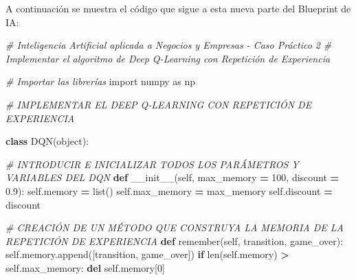 \documentclass[
]{book}
\newenvironment{Shaded}{\begin{snugshade}}{\end{snugshade}}
\newcommand{\BuiltInTok}[1]{#1}
\newcommand{\CommentTok}[1]{\textcolor[rgb]{0.56,0.35,0.01}{\textit{#1}}}
\newcommand{\ControlFlowTok}[1]{\textcolor[rgb]{0.13,0.29,0.53}{\textbf{#1}}}
\newcommand{\DecValTok}[1]{\textcolor[rgb]{0.00,0.00,0.81}{#1}}
\newcommand{\FloatTok}[1]{\textcolor[rgb]{0.00,0.00,0.81}{#1}}
\newcommand{\FunctionTok}[1]{\textcolor[rgb]{0.00,0.00,0.00}{#1}}
\newcommand{\ImportTok}[1]{#1}
\newcommand{\KeywordTok}[1]{\textcolor[rgb]{0.13,0.29,0.53}{\textbf{#1}}}
\newcommand{\NormalTok}[1]{#1}
\newcommand{\OperatorTok}[1]{\textcolor[rgb]{0.81,0.36,0.00}{\textbf{#1}}}
\newcommand{\VariableTok}[1]{\textcolor[rgb]{0.00,0.00,0.00}{#1}}
\begin{document}
A continuación se muestra el código que sigue a esta nueva parte del Blueprint de IA:

\begin{Shaded}
\begin{Highlighting}[]
\CommentTok{\# Inteligencia Artificial aplicada a Negocios y Empresas {-} Caso Práctico 2}
\CommentTok{\# Implementar el algoritmo de Deep Q{-}Learning con Repetición de Experiencia}

\CommentTok{\# Importar las librerías}
\ImportTok{import}\NormalTok{ numpy }\ImportTok{as}\NormalTok{ np}

\CommentTok{\# IMPLEMENTAR EL DEEP Q{-}LEARNING CON REPETICIÓN DE EXPERIENCIA}

\KeywordTok{class}\NormalTok{ DQN(}\BuiltInTok{object}\NormalTok{):}
    
    \CommentTok{\# INTRODUCIR E INICIALIZAR TODOS LOS PARÁMETROS Y VARIABLES DEL DQN}
    \KeywordTok{def} \FunctionTok{\_\_init\_\_}\NormalTok{(}\VariableTok{self}\NormalTok{, max\_memory }\OperatorTok{=} \DecValTok{100}\NormalTok{, discount }\OperatorTok{=} \FloatTok{0.9}\NormalTok{):}
        \VariableTok{self}\NormalTok{.memory }\OperatorTok{=} \BuiltInTok{list}\NormalTok{()}
        \VariableTok{self}\NormalTok{.max\_memory }\OperatorTok{=}\NormalTok{ max\_memory}
        \VariableTok{self}\NormalTok{.discount }\OperatorTok{=}\NormalTok{ discount}

    \CommentTok{\# CREACIÓN DE UN MÉTODO QUE CONSTRUYA LA MEMORIA DE LA REPETICIÓN DE EXPERIENCIA}
    \KeywordTok{def}\NormalTok{ remember(}\VariableTok{self}\NormalTok{, transition, game\_over):}
        \VariableTok{self}\NormalTok{.memory.append([transition, game\_over])}
        \ControlFlowTok{if} \BuiltInTok{len}\NormalTok{(}\VariableTok{self}\NormalTok{.memory) }\OperatorTok{\textgreater{}} \VariableTok{self}\NormalTok{.max\_memory:}
            \KeywordTok{del} \VariableTok{self}\NormalTok{.memory[}\DecValTok{0}\NormalTok{]}


\end{Highlighting}
\end{Shaded}
\end{document}

